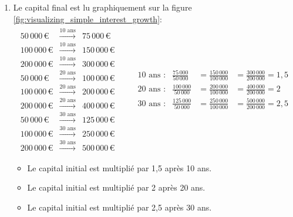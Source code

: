\documentclass{article}
\begin{document}
\begin{enumerate}[label=\textbf{R1.\arabic*}]
                \item Le capital final est lu graphiquement sur la figure \ref{fig:visualizing_simple_interest_growth}:
                \begin{align*}
                    \begin{array}{rcl}
                        50\,000\,\text{€}  & \xrightarrow{\text{10 ans}} & 75\,000\,\text{€} \\
                        100\,000\,\text{€} & \xrightarrow{\text{10 ans}} & 150\,000\,\text{€} \\
                        200\,000\,\text{€} & \xrightarrow{\text{10 ans}} & 300\,000\,\text{€} \\
                        50\,000\,\text{€}  & \xrightarrow{\text{20 ans}} & 100\,000\,\text{€} \\
                        100\,000\,\text{€} & \xrightarrow{\text{20 ans}} & 200\,000\,\text{€} \\
                        200\,000\,\text{€} & \xrightarrow{\text{20 ans}} & 400\,000\,\text{€} \\
                        50\,000\,\text{€}  & \xrightarrow{\text{30 ans}} & 125\,000\,\text{€} \\
                        100\,000\,\text{€} & \xrightarrow{\text{30 ans}} & 250\,000\,\text{€} \\
                        200\,000\,\text{€} & \xrightarrow{\text{30 ans}} & 500\,000\,\text{€}
                    \end{array}
                    \qquad
                    \begin{array}{rrcl}
                        10 \text{ ans :} & \displaystyle \frac{75\,000}{50\,000}  & = \displaystyle \frac{150\,000}{100\,000} & = \displaystyle \frac{300\,000}{200\,000} = 1,5 \\[1em]
                        20 \text{ ans :} & \displaystyle \frac{100\,000}{50\,000} & = \displaystyle \frac{200\,000}{100\,000} & = \displaystyle \frac{400\,000}{200\,000} = 2   \\[1em]
                        30 \text{ ans :} & \displaystyle \frac{125\,000}{50\,000} & = \displaystyle \frac{250\,000}{100\,000} & = \displaystyle \frac{500\,000}{200\,000} = 2,5 
                    \end{array}
                \end{align*}

                \begin{itemize}
                    \item Le capital initial est multiplié par 1,5 après 10 ans.
                    \item Le capital initial est multiplié par 2 après 20 ans.
                    \item Le capital initial est multiplié par 2,5 après 30 ans.
                \end{itemize}


\end{enumerate}
\end{document}
